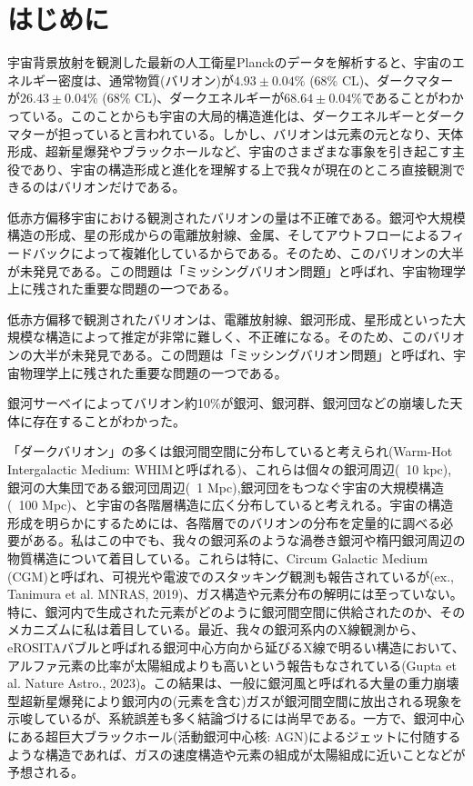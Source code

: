 \chapter{はじめに}

宇宙背景放射を観測した最新の人工衛星Planckのデータを解析すると、宇宙のエネルギー密度は、通常物質(バリオン)が$4.93\pm0.04\%$ (68\% CL)、ダークマターが$26.43\pm0.04$\% (68\% CL)、ダークエネルギーが$68.64\pm0.04$\%であることがわかっている\citep{aghanim_planck_2020}。このことからも宇宙の大局的構造進化は、ダークエネルギーとダークマターが担っていると言われている。しかし、バリオンは元素の元となり、天体形成、超新星爆発やブラックホールなど、宇宙のさまざまな事象を引き起こす主役であり、宇宙の構造形成と進化を理解する上で我々が現在のところ直接観測できるのはバリオンだけである。


低赤方偏移宇宙における観測されたバリオンの量は不正確である。銀河や大規模構造の形成、星の形成からの電離放射線、金属、そしてアウトフローによるフィードバックによって複雑化しているからである\citep{shull_baryon_2012}。そのため、このバリオンの大半が未発見である。この問題は「ミッシングバリオン問題」と呼ばれ、宇宙物理学上に残された重要な問題の一つである。

低赤方偏移で観測されたバリオンは、電離放射線、銀河形成、星形成といった大規模な構造によって推定が非常に難しく、不正確になる。そのため、このバリオンの大半が未発見である。この問題は「ミッシングバリオン問題」と呼ばれ、宇宙物理学上に残された重要な問題の一つである。

銀河サーベイによってバリオン約10\%が銀河、銀河群、銀河団などの崩壊した天体に存在することがわかった。


「ダークバリオン」の多くは銀河間空間に分布していると考えられ(Warm-Hot Intergalactic Medium: WHIMと呼ばれる)、これらは個々の銀河周辺(~10 kpc), 銀河の大集団である銀河団周辺(~1 Mpc),銀河団をもつなぐ宇宙の大規模構造(~100 Mpc)、と宇宙の各階層構造に広く分布していると考えれる。宇宙の構造形成を明らかにするためには、各階層でのバリオンの分布を定量的に調べる必要がある。私はこの中でも、我々の銀河系のような渦巻き銀河や楕円銀河周辺の物質構造について着目している。これらは特に、Circum Galactic Medium (CGM)と呼ばれ、可視光や電波でのスタッキング観測も報告されているが(ex., Tanimura et al. MNRAS, 2019)、ガス構造や元素分布の解明には至っていない。特に、銀河内で生成された元素がどのように銀河間空間に供給されたのか、そのメカニズムに私は着目している。最近、我々の銀河系内のX線観測から、eROSITAバブルと呼ばれる銀河中心方向から延びるX線で明るい構造において、アルファ元素の比率が太陽組成よりも高いという報告もなされている(Gupta et al. Nature Astro., 2023)。この結果は、一般に銀河風と呼ばれる大量の重力崩壊型超新星爆発により銀河内の(元素を含む)ガスが銀河間空間に放出される現象を示唆しているが、系統誤差も多く結論づけるには尚早である。一方で、銀河中心にある超巨大ブラックホール(活動銀河中心核: AGN)によるジェットに付随するような構造であれば、ガスの速度構造や元素の組成が太陽組成に近いことなどが予想される。

